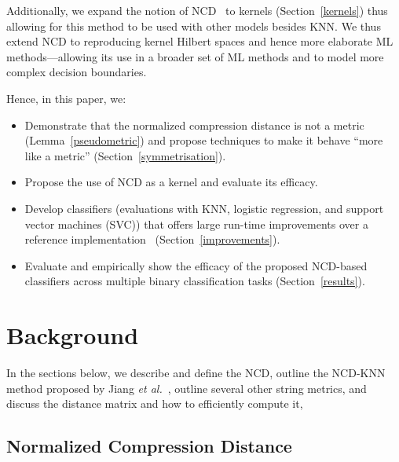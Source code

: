 \documentclass[preprint,12pt]{article}
\begin{document}
Additionally, we expand the notion of NCD~\cite{opitz2023gzip,weinreich2023parameter,nishida2011tweet,ncd,jiang2022less,jiang2022less} to kernels (Section~\ref{kernels}) thus allowing for this method to be used with other models besides KNN\@.
We thus extend NCD to reproducing kernel Hilbert spaces and hence more elaborate ML methods---allowing its use in a broader set of ML methods and to model more complex decision boundaries.

Hence, in this paper, we:

\begin{itemize}
    \item Demonstrate that the normalized compression distance is not a metric (Lemma~\ref{pseudometric}) and propose techniques to make it behave ``more like a metric'' (Section~\ref{symmetrisation}).
    \item Propose the use of NCD as a kernel and evaluate its efficacy.
    \item Develop classifiers (evaluations with KNN, logistic regression, and support vector machines (SVC)) that offers large run-time improvements over a reference implementation~\cite{jiang2022less} (Section~\ref{improvements}).
    \item Evaluate and empirically show the efficacy of the proposed NCD-based classifiers across multiple binary classification tasks (Section~\ref{results}).
\end{itemize}



\section{Background}

In the sections below, we describe and define the NCD, outline the NCD-KNN method proposed by Jiang \textit{et al.}~\cite{jiang2022less}, outline several other string metrics, and discuss the distance matrix and how to efficiently compute it,



\subsection{Normalized Compression Distance}
\label{ncd}
\end{document}
